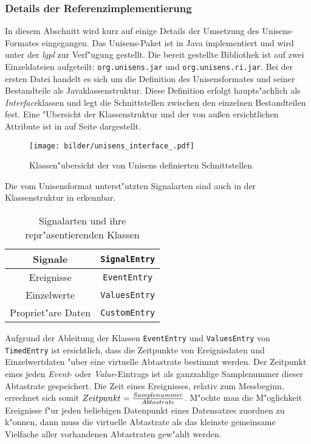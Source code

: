 \subsubsection{Details der Referenzimplementierung}

In diesem Abschnitt wird kurz auf einige Details der Umsetzung des Unisens-Formates eingegangen.
Das Unisens-Paket ist in Java implementiert und wird unter der \emph{\ac{lgpl}} zur Verf"ugung gestellt.
Die bereit gestellte Bibliothek ist auf zwei Einzeldateien aufgeteilt: \verb|org.unisens.jar| und \verb|org.unisens.ri.jar|.
Bei der ersten Datei handelt es sich um die Definition des Unisensformates und seiner Bestandteile als Javaklassenstruktur.
Diese Definition erfolgt haupts"achlich als \emph{Interface}klassen und legt die Schnittstellen zwischen den einzelnen Bestandteilen fest.
Eine "Ubersicht der Klassenstruktur und der von au\ss en ersichtlichen Attribute ist in  auf Seite \pageref{pic:unisens_interface} dargestellt.
\begin{sidewaysfigure}%
\centering
\texttt{[image: bilder/unisens\_interface\_.pdf]}
\caption{Klassen"ubersicht der von Unisens definierten Schnittstellen}
\label{pic:unisens_interface}
\end{sidewaysfigure}
Die vom Unisensformat unterst"utzten Signalarten sind auch in der Klassenstruktur in  erkennbar.
\begin{table}[h]
\centering
\begin{tabular}{|c|c|}
	\hline Signale & \verb|SignalEntry| \\
	\hline Ereignisse & \verb|EventEntry| \\
	\hline Einzelwerte & \verb|ValuesEntry| \\
	\hline Propriet"are Daten & \verb|CustomEntry| \\
	\hline
\end{tabular}
\caption{Signalarten und ihre repr"asentierenden Klassen}
\label{tab:unisens_signalklassen}
\end{table}

Aufgrund der Ableitung der Klassen \verb|EventEntry| und \verb|ValuesEntry| von \verb|TimedEntry| ist ersichtlich, dass die Zeitpunkte von Ereignisdaten und Einzelwertdaten "uber eine virtuelle Abtastrate bestimmt werden.
Der Zeitpunkt eines jeden \emph{Event}- oder \emph{Value}-Eintrags ist als ganzzahlige Samplenummer dieser Abtastrate gespeichert.
Die Zeit eines Ereignisses, relativ zum Messbeginn, errechnet sich somit $Zeitpunkt = {Samplenummer \over Abtastrate}$.
M"ochte man die M"oglichkeit Ereignisse f"ur jeden beliebigen Datenpunkt eines Datensatzes zuordnen zu k"onnen, dann muss die virtuelle Abtastrate als das kleinste gemeinsame Vielfache aller vorhandenen Abtastraten gew"ahlt werden.

